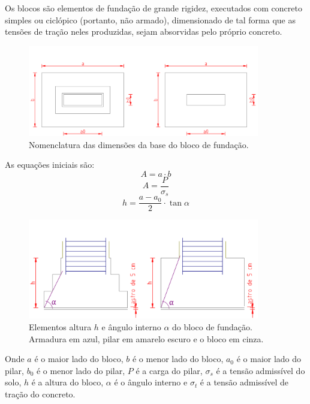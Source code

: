 Os blocos são elementos de fundação de grande rigidez, executados com concreto simples ou ciclópico (portanto, não armado), dimensionado de tal forma que as tensões de tração neles produzidas, sejam absorvidas pelo próprio concreto.

\begin{figure}[htb]
	\begin{center}
	\caption{Nomenclatura das dimensões da base do bloco de fundação.}
    	\includegraphics[width=0.9\textwidth]{Fundacoes-rasas-ou-diretas/Imagens/Bloco-de-fundacao-1.png}
	\end{center}
\end{figure}

As equações iniciais são: $$A=a\cdot b$$ $$A=\frac{P}{\sigma_s}$$ $$h=\frac{a-a_0}{2}\cdot \tan{\alpha}$$

\begin{figure}[htb]
	\begin{center}
	\caption{Elementos altura $h$ e ângulo interno $\alpha$ do bloco de fundação. Armadura em azul, pilar em amarelo escuro e o bloco em cinza.}
    	\includegraphics[width=0.9\textwidth]{Fundacoes-rasas-ou-diretas/Imagens/Bloco-de-fundacao-2.png}
	\end{center}
\end{figure}

Onde $a$ é o maior lado do bloco, $b$ é o menor lado do bloco, $a_0$ é o maior lado do pilar, $b_0$ é o menor lado do pilar, $P$ é a carga do pilar, $\sigma_s$ é a tensão admissível do solo, $h$ é a altura do bloco, $\alpha$ é o ângulo interno e $\sigma_t$ é a tensão admissível de tração do concreto.

